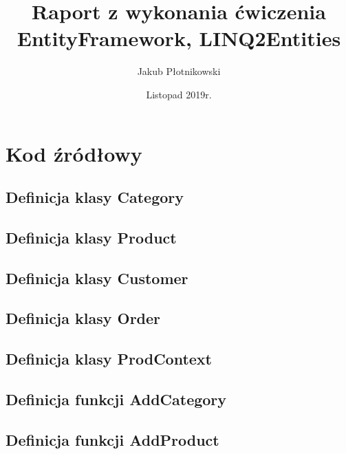 \documentclass[a4paper, 11pt]{article}
\title{Raport z wykonania ćwiczenia EntityFramework, LINQ2Entities}
\author{Jakub Płotnikowski}
\date{Listopad 2019r.}
\begin{document}
    \maketitle
    \tableofcontents
    
    \newpage
    
    \section{Kod źródłowy}
    
    \subsection{Definicja klasy Category}
    

    \subsection{Definicja klasy Product}
    
    
    \newpage
    
    \subsection{Definicja klasy Customer}
    
    
    \subsection{Definicja klasy Order}
    
    
    \newpage
    
    \subsection{Definicja klasy ProdContext}
    
    
    \subsection{Definicja funkcji AddCategory}
    
    
    \subsection{Definicja funkcji AddProduct}
    
    
\end{document}
